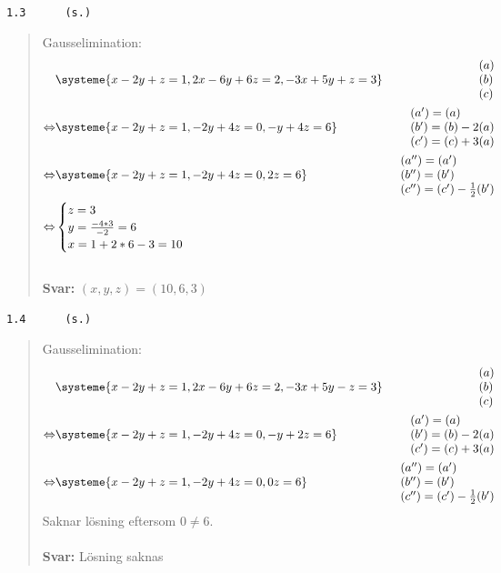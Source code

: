 \documentclass[a4paper]{article}
\newcommand{\tskcol}[1]{\textcolor{tskcol}{#1}}
\begin{document}
\pagebreak
\texttt{\tskcol{1.3~~~~~ (s.)}}
\begin{quotation}
	\noindent
	Gausselimination:
	\begin{align*}
		&\systeme{
			  x-2y+ z=1,
			 2x-6y+6z=2,
			-3x+5y+ z=3}  
		&\begin{array}{l} 
			(a) \\ 
			(b) \\
			(c)
		\end{array} \\ \Leftrightarrow
		&\systeme{
			x-2y+ z=1,
			 -2y+4z=0,
			 - y+4z=6}  
		&\begin{array}{l} 
			(a')=(a) \\ 
			(b')=(b)-2(a) \\
			(c')=(c)+3(a)
		\end{array} \\ \Leftrightarrow
		&\systeme{
			x-2y+ z=1,
			 -2y+4z=0,
			     2z=6}  
		&\begin{array}{l} 
			(a'')=(a') \\ 
			(b'')=(b') \\
			(c'')=(c')-\frac{1}{2}(b')
		\end{array} \\ \Leftrightarrow
		&\begin{cases}
			z=3 \\
			y=\frac{-4*3}{-2} =6\\
			x=1+2*6-3=10
		\end{cases}
	\end{align*}
	\\
	\textbf{Svar:} $(x,y,z)=(10,6,3)$
\end{quotation}

\texttt{\tskcol{1.4~~~~~ (s.)}}
\begin{quotation}
	\noindent
	Gausselimination:
	\begin{align*}
	&\systeme{
		  x-2y+ z=1,
		 2x-6y+6z=2,
		-3x+5y- z=3}  
	&\begin{array}{l} 
	(a) \\ 
	(b) \\
	(c)
	\end{array} \\ \Leftrightarrow
	&\systeme{
		x-2y+ z=1,
		 -2y+4z=0,
		 - y+2z=6}  
	&\begin{array}{l} 
	(a')=(a) \\ 
	(b')=(b)-2(a) \\
	(c')=(c)+3(a)
	\end{array} \\ \Leftrightarrow
	&\systeme{
		x-2y+ z=1,
		 -2y+4z=0,
		      0z=6}  
	&\begin{array}{l} 
	(a'')=(a') \\ 
	(b'')=(b') \\
	(c'')=(c')-\frac{1}{2}(b')
	\end{array}
	\end{align*}
	Saknar lösning eftersom $0\neq6$.
	\\ \\
	\textbf{Svar:} Lösning saknas
\end{quotation}
\end{document}
